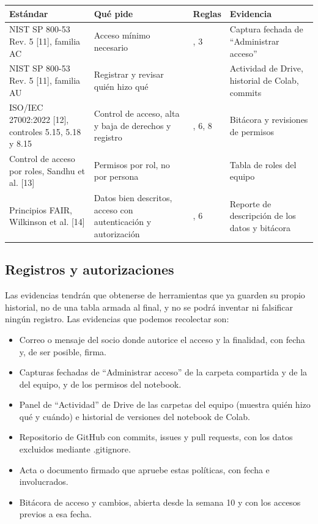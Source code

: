 \begin{table}[H]
  \centering
  \small
  \begin{tabularx}{\textwidth}{>{\raggedright\arraybackslash}p{}>{\raggedright\arraybackslash}X>{\raggedright\arraybackslash}p{}>{\raggedright\arraybackslash}X}
    \toprule
    Estándar & Qué pide & Reglas & Evidencia \\
    \midrule
    NIST SP 800-53 Rev. 5 [11], familia AC & Acceso mínimo necesario & 2, 3 & Captura fechada de “Administrar acceso” \\
    NIST SP 800-53 Rev. 5 [11], familia AU & Registrar y revisar quién hizo qué & 6 & Actividad de Drive, historial de Colab, commits \\
    ISO/IEC 27002:2022 [12], controles 5.15, 5.18 y 8.15 & Control de acceso, alta y baja de derechos y registro & 2, 6, 8 & Bitácora y revisiones de permisos \\
    Control de acceso por roles, Sandhu et al. [13] & Permisos por rol, no por persona & 2 & Tabla de roles del equipo \\
    Principios FAIR, Wilkinson et al. [14] & Datos bien descritos, acceso con autenticación y autorización & 2, 6 & Reporte de descripción de los datos y bitácora \\
    \bottomrule
  \end{tabularx}
\end{table}

\subsection{Registros y autorizaciones}

Las evidencias tendrán que obtenerse de herramientas que ya guarden su propio historial, no de una tabla armada al final, y no se podrá inventar ni falsificar ningún registro. Las evidencias que podemos recolectar son:

\begin{itemize}
  \item Correo o mensaje del socio donde autorice el acceso y la finalidad, con fecha y, de ser posible, firma.
  \item Capturas fechadas de “Administrar acceso” de la carpeta compartida y de la del equipo, y de los permisos del notebook.
  \item Panel de “Actividad” de Drive de las carpetas del equipo (muestra quién hizo qué y cuándo) e historial de versiones del notebook de Colab.
  \item Repositorio de GitHub con commits, issues y pull requests, con los datos excluidos mediante .gitignore.
  \item Acta o documento firmado que apruebe estas políticas, con fecha e involucrados.
  \item Bitácora de acceso y cambios, abierta desde la semana 10 y con los accesos previos a esa fecha.
\end{itemize}

